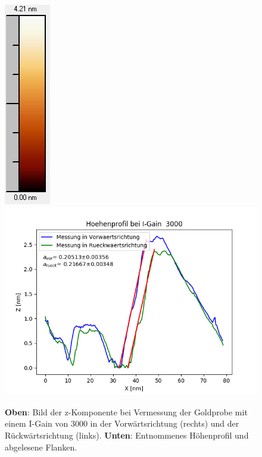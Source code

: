 \documentclass[12pt,a4paper]{article}
\begin{document}
\begin{figure}
\includegraphics[scale=0.6]{Bilder/Anhang/IGain/3000_IGain_nach_Skala.jpg}
\includegraphics[scale=0.6]{Bilder/Anhang/IGain/Profil_IGain_3000.png}
\caption{\textbf{Oben}: Bild der z-Komponente bei Vermessung der Goldprobe mit einem I-Gain von 3000 in der Vorwärtsrichtung (rechts) und der Rückwärtsrichtung (links). \textbf{Unten}: Entnommenes Höhenprofil und abgelesene Flanken.}
\end{figure}
\end{document}
